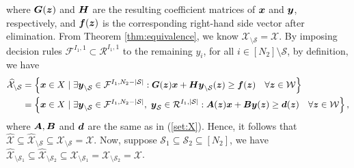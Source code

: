 \documentclass[fleqn,mnsc,blindrev]{informs4}
\newcommand{\mb}[1]{\mbox{\boldmath \ensuremath{#1}}}
\begin{document}
	where $\mb{G}(\mb{z})$ and $\mb{H}$ are the resulting coefficient matrices of $\mb{x}$ and $\mb{y}$, respectively, and $\mb{f}(\mb{z})$ is the corresponding right-hand side vector after elimination. From Theorem \ref{thm:equivalence}, we know $\mathcal{X}_{\setminus \mathcal{S}} = \mathcal{X}$. By imposing decision rules  $\mathcal{F}^{I_1,1}\subset \mathcal{R}^{I_1,1}$ to the remaining $y_i$, for all $i \in [N_2]\setminus \mathcal{S}$, by definition, we have
\begin{align*}
		\widehat{\mathcal{X}}_{\setminus \mathcal{S}} & = \left\{ \mb{x}\in X \hspace{3pt} | \hspace{3pt}  \exists  \mb{y}_{\setminus \mathcal{S}} \in \mathcal{F}^{I_1,N_2-|\mathcal{S}|}: \mb{G}(\mb{z})\mb{x}+\mb{H}\mb{y}_{\setminus \mathcal{S}}(\mb{z}) \geq \mb{f}(\mb{z}) \quad \forall \mb{z} \in \mathcal{W}\right\}\\
		& = \left\{ \mb{x} \in X \hspace{3pt} | \hspace{3pt}  \exists   \mb{y}_{\setminus \mathcal{S}} \in \mathcal{F}^{I_1,N_2-|\mathcal{S}|}, \hspace{3pt} \mb{y}_{\mathcal{S}} \in \mathcal{R}^{I_1,|\mathcal{S}|}: \mb{A}(\mb{z})\mb{x}+\mb{B}\mb{y}(\mb{z}) \geq \mb{d}(\mb{z}) \quad  \forall \mb{z} \in \mathcal{W} \right\}, 
\end{align*}
	where $\mb{A}, \mb{B}$ and $\mb{d}$ are the same as in (\ref{set:X}). Hence, it follows that $\widehat{\mathcal{X}} \subseteq  \widehat{\mathcal{X}}_{\setminus \mathcal{S}} \subseteq \mathcal{X}_{\setminus \mathcal{S}} = \mathcal{X}$. Now, suppose $\mathcal{S}_1 \subseteq \mathcal{S}_2 \subseteq [N_2]$, we have  $\widehat{\mathcal{X}}_{\setminus \mathcal{S}_1}  \subseteq  \widehat{\mathcal{X}}_{\setminus \mathcal{S}_2} \subseteq \mathcal{X}_{\setminus \mathcal{S}_1}= \mathcal{X}_{\setminus \mathcal{S}_2}  = \mathcal{X}$.  \hfill \Halmos \\
	
\end{document}
